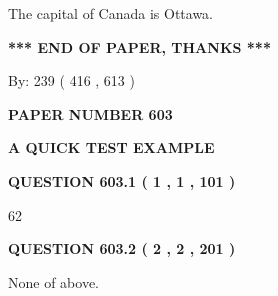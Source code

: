 \documentclass[12pt]{article}
\begin{document}
 
The capital of Canada is Ottawa.
 
 
 
 
   
   
 \vspace{0.2in}
 
   
   
   
   
\vspace{1.0in} 
{\textbf{\large{ *** END OF PAPER, THANKS *** }}} 
   
   
\hspace{1.0in} By: 
 239 ( 416 ,  613 )
   
   
   
   
\newpage 
\setcounter{page}{ 
   603001 } 
   
   
   
   
 {\textbf{ \Large{ PAPER NUMBER  603  }}}
   
   
\vspace{0.2in}
   
   
   
   
   
   
 \vspace{0.2in}
{\LARGE {\textbf{ A QUICK TEST EXAMPLE}}}
   
   
  
\vspace{0.2in}
  
{\textbf{\Large{QUESTION
603.1 
 ( 1 , 1 , 101 )
}}}
  
  
 
 
\noindent{}

62
 
 
  
\vspace{0.2in}
  
{\textbf{\Large{QUESTION
603.2 
 ( 2 , 2 , 201 )
}}}
  
  
 
 
\noindent{}
 
 
 None of above.
 
 
 
 
   
   
 \vspace{0.2in}
 
\end{document}
